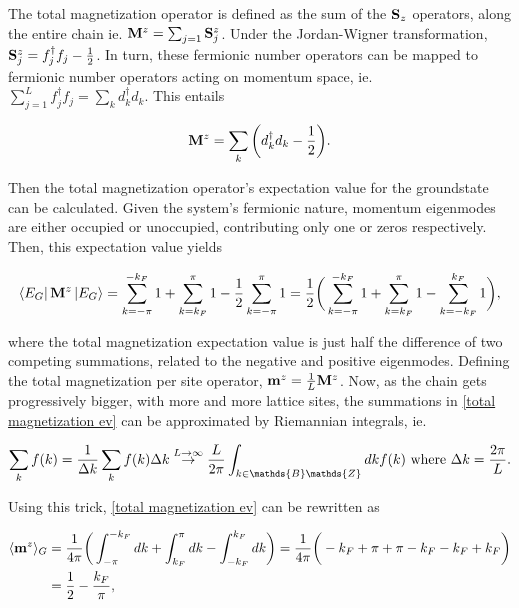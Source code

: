 \documentclass{homework}
\begin{document}
The total magnetization operator is defined as the sum of the ${\bf S}_z$ operators, along the entire chain ie. ${\bf M}^z = \sum_{j=1} {\bf S}^z_j$. Under the Jordan-Wigner transformation, ${\bf S}^z_j = f_j^\dagger f_j - \frac{1}{2}$. In turn, these fermionic number operators can be mapped to fermionic number operators acting on momentum space, ie. $\sum_{j=1}^{L} f_j^\dagger f_j = \sum_k d_k^\dagger d_k$. This entails

\begin{equation}
    {\bf M}^z = \sum_{k} \bigg(d_k^\dagger d_k - \frac{1}{2}\bigg).
\end{equation}

Then the total magnetization operator's expectation value for the groundstate can be calculated. Given the system's fermionic nature, momentum eigenmodes are either occupied or unoccupied, contributing only one or zeros respectively. Then, this expectation value yields

\begin{equation}
    \bra{E_G} {{\bf M}^z} \ket{E_G} = \sum_{k=-\pi}^{-k_F} 1 + \sum_{k=k_F}^{\pi} 1 - \frac{1}{2} \sum_{k=-\pi}^{\pi} 1 \\
    = \frac{1}{2} \bigg( \sum_{k=-\pi}^{-k_F} 1 + \sum_{k=k_F}^{\pi} 1 - \sum_{k = -k_F}^{k_F} 1  \bigg), \label{total magnetization ev}
\end{equation}

where the total magnetization expectation value is just half the difference of two competing summations, related to the negative and positive eigenmodes. Defining the total magnetization per site operator, ${{\bf m}}^z = \frac{1}{L} {\bf M}^z$. Now, as the chain gets progressively bigger, with more and more lattice sites, the summations in \eqref{total magnetization ev} can be approximated by Riemannian integrals, ie.

\begin{equation*}
    \sum_{k} f(k) = \frac{1}{\Delta k} \sum_{k} f(k) \Delta k \overset{L \rightarrow \infty}{\rightarrow} \frac{L}{2\pi}\int_{k \in \mathds{B}\mathds{Z}} dk f(k) \textnormal{ where } \Delta k = \frac{2\pi}{L}.
\end{equation*}

Using this trick, \eqref{total magnetization ev} can be rewritten as 

\begin{align}
    \langle {{\bf m}}^{z} \rangle_{G} &= \frac{1}{4\pi} \bigg(\int_{-\pi}^{-k_F} dk + \int_{k_F}^{\pi} dk - \int_{-k_F}^{k_F} dk \bigg) = \frac{1}{4\pi} \bigg(-k_F + \pi + \pi - k_F - k_F + k_F\bigg) \\
    &= \frac{1}{2} - \frac{k_F}{\pi},
\end{align}
\end{document}

